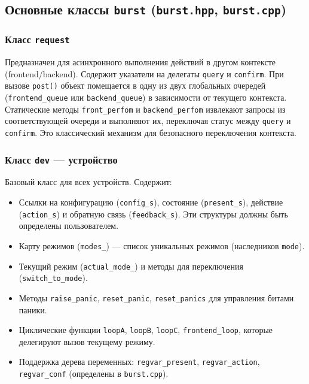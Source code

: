 \documentclass[a4paper,12pt]{article}
\begin{document}
\subsection{Основные классы \texttt{burst} (\texttt{burst.hpp}, \texttt{burst.cpp})}

\subsubsection{Класс \texttt{request}}

Предназначен для асинхронного выполнения действий в другом контексте (frontend/backend). Содержит указатели на делегаты \texttt{query} и \texttt{confirm}. При вызове \texttt{post()} объект помещается в одну из двух глобальных очередей (\texttt{frontend\_queue} или \texttt{backend\_queue}) в зависимости от текущего контекста. Статические методы \texttt{front\_perfom} и \texttt{backend\_perfom} извлекают запросы из соответствующей очереди и выполняют их, переключая статус между \texttt{query} и \texttt{confirm}. Это классический механизм для безопасного переключения контекста.

\subsubsection{Класс \texttt{dev} — устройство}

Базовый класс для всех устройств. Содержит:

\begin{itemize}
    \item Ссылки на конфигурацию (\texttt{config\_s}), состояние (\texttt{present\_s}), действие (\texttt{action\_s}) и обратную связь (\texttt{feedback\_s}). Эти структуры должны быть определены пользователем.
    \item Карту режимов (\texttt{modes\_}) — список уникальных режимов (наследников \texttt{mode}).
    \item Текущий режим (\texttt{actual\_mode\_}) и методы для переключения (\texttt{switch\_to\_mode}).
    \item Методы \texttt{raise\_panic}, \texttt{reset\_panic}, \texttt{reset\_panics} для управления битами паники.
    \item Циклические функции \texttt{loopA}, \texttt{loopB}, \texttt{loopC}, \texttt{frontend\_loop}, которые делегируют вызов текущему режиму.
    \item Поддержка дерева переменных: \texttt{regvar\_present}, \texttt{regvar\_action}, \texttt{regvar\_conf} (определены в \texttt{burst.cpp}).
\end{itemize}
\end{document}
